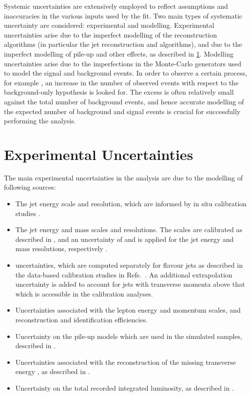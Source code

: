 Systemic uncertainties are extensively employed to reflect assumptions and inaccuracies in the various inputs used by the fit.
Two main types of systematic uncertainty are considered: experimental and modelling.
Experimental uncertainties arise due to the imperfect modelling of the reconstruction algorithms (in particular the jet reconstruction and \btagging algorithms), and due to the imperfect modelling of pile-up and other effects, as described in \cref{sec:experimental_uncertainties}.
Modelling uncertainties arise due to the imperfections in the Monte-Carlo generators used to model the signal and background events.
In order to observe a certain process, for example \VHbb, an increase in the number of observed events with respect to the background-only hypothesis is looked for.
The excess is often relatively small against the total number of background events, and hence accurate modelling of the expected number of background and signal events is crucial for successfully performing the analysis.


\section{Experimental Uncertainties}\label{sec:experimental_uncertainties}

The main experimental uncertainties in the analysis are due to the modelling of following sources:

\begin{itemize}
  \item The \smallR jet energy scale and resolution, which are informed by in situ calibration studies \cite{PERF-2016-04}.
  \item The \largeR jet energy and mass scales and resolutions. The scales are calibrated as described in , and an uncertainty of  and  is applied for the jet energy and mass resolutions, respectively \cite{STDM-2011-19,ATLAS-CONF-2016-035}.
  \item \btagging uncertainties, which are computed separately for \bcl flavour jets as described in the data-based calibration studies in Refs.~\cite{PERF-2016-05,ATLAS-CONF-2018-006,ATLAS-CONF-2018-001}. An additional extrapolation uncertainty is added to account for jets with transverse momenta above that which is accessible in the calibration analyses.
  \item Uncertainties associated with the lepton energy and momentum scales, and reconstruction and identification efficiencies.
  \item Uncertainty on the pile-up models which are used in the simulated samples, described in .
  \item Uncertainties associated with the reconstruction of the missing transverse energy \ETmiss, as described in .
  \item Uncertainty on the total recorded integrated luminosity, as described in .
\end{itemize}

